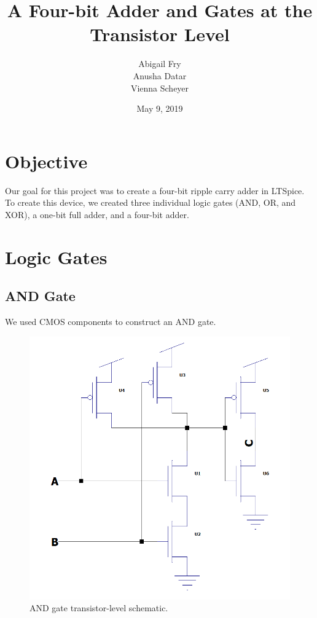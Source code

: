 \documentclass{article}
\title{A Four-bit Adder and Gates at the Transistor Level}
\author{Abigail Fry \\ Anusha Datar \\ Vienna Scheyer }
\date{May 9, 2019}
\begin{document}
\maketitle

\section{Objective}
Our goal for this project was to create a four-bit ripple carry adder in LTSpice. To create this device, we created three individual logic gates (AND, OR, and XOR), a one-bit full adder, and a four-bit adder. 

\section{Logic Gates}
\subsection{AND Gate}
We used CMOS components to construct an AND gate.
\begin{figure}[H]
  \begin{center}      
  \includegraphics[scale = 0.5]{images/andgate.PNG}
  \caption{AND gate transistor-level schematic.}
  \label{fig:AND_schem}
  \end{center}
\end{figure}
\end{document}
